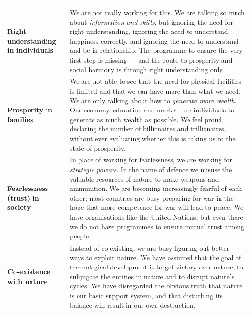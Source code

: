 
\ans
\renewcommand{\arraystretch}{1.3}
\begin{longtable}{P{40mm} P{112mm}}
 &  \\ \hline \endfirsthead
{} &  \\ \hline \endhead
\textbf{Right understanding in individuals} &
  We are not really working for this. We are talking so much about
  \emph{information and skills}, but ignoring the need for right
  understanding, ignoring the need to understand happiness correctly, and
  ignoring the need to understand and be in relationship. The programme to
  ensure the very first step is missing --- and the route to prosperity and
  social harmony is through right understanding only. \\ \hline
\textbf{Prosperity in families} &
  We are not able to see that the need for physical facilities is limited and
  that we can have more than what we need. We are only talking about how to
  \emph{generate more wealth}. Our economy, education and market lure
  individuals to generate as much wealth as possible. We feel proud declaring
  the number of billionaires and trillionaires, without ever evaluating
  whether this is taking us to the state of prosperity. \\ \hline
\textbf{Fearlessness (trust) in society} &
  In place of working for fearlessness, we are working for \emph{strategic
  powers}. In the name of defence we misuse the valuable resources of nature
  to make weapons and ammunition. We are becoming increasingly fearful of each
  other; most countries are busy preparing for war in the hope that more
  competence for war will lead to peace. We have organisations like the United
  Nations, but even there we do not have programmes to ensure mutual trust
  among people. \\ \hline
\textbf{Co-existence with nature} &
  Instead of co-existing, we are busy figuring out better ways to exploit
  nature. We have assumed that the goal of technological development is to get
  victory over nature, to subjugate the entities in nature and to disrupt
  nature's cycles. We have disregarded the obvious truth that nature is our
  basic support system, and that disturbing its balance will result in our own
  destruction. \\ \hline
\end{longtable}

